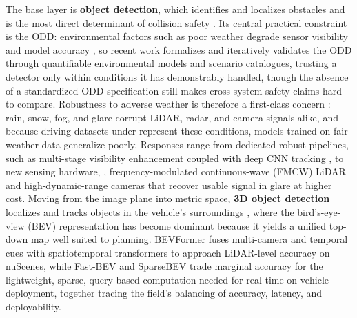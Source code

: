 The base layer is \textbf{object detection}, which identifies and localizes obstacles and is the most direct determinant of collision safety \cite{FengHWD22}. Its central practical constraint is the ODD: environmental factors such as poor weather degrade sensor visibility and model accuracy \cite{KoopmanF19}, so recent work formalizes and iteratively validates the ODD through quantifiable environmental models and scenario catalogues, trusting a detector only within conditions it has demonstrably handled, though the absence of a standardized ODD specification still makes cross-system safety claims hard to compare. Robustness to adverse weather is therefore a first-class concern \cite{zhang2023perception,TahirZACE24,HnewaR21}: rain, snow, fog, and glare corrupt LiDAR, radar, and camera signals alike, and because driving datasets under-represent these conditions, models trained on fair-weather data generalize poorly. Responses range from dedicated robust pipelines, such as multi-stage visibility enhancement coupled with deep CNN tracking \cite{HassaballahKMM21}, to new sensing hardware, \eg, frequency-modulated continuous-wave (FMCW) LiDAR and high-dynamic-range cameras that recover usable signal in glare at higher cost. Moving from the image plane into metric space, \textbf{3D object detection} localizes and tracks objects in the vehicle's surroundings \cite{LiWLXSLQD22}, where the bird's-eye-view (BEV) representation has become dominant because it yields a unified top-down map well suited to planning. BEVFormer \cite{YangCTTZZHLQLZD23} fuses multi-camera and temporal cues with spatiotemporal transformers to approach LiDAR-level accuracy on nuScenes, while Fast-BEV \cite{LiHCCLSLXSOS24} and SparseBEV \cite{LiuTLWW23} trade marginal accuracy for the lightweight, sparse, query-based computation needed for real-time on-vehicle deployment, together tracing the field's balancing of accuracy, latency, and deployability.

